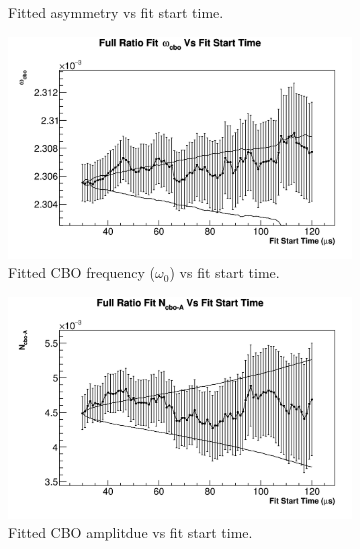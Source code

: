 \begin{figure}[]
\begin{subfigure}[t]{0.45\textwidth}
		    \caption{Fitted asymmetry vs fit start time.}
	    \end{subfigure}
	    \begin{subfigure}[t]{0.45\textwidth}
		    \centering
			\includegraphics[width=\textwidth]{RatioCBO_omega_cbo_FS_Canv}
		    \caption{Fitted CBO frequency ($\omega_{0}$) vs fit start time.}
	    \end{subfigure}%
	    \vspace{4mm}
	    \begin{subfigure}[t]{0.45\textwidth}
		    \centering
			\includegraphics[width=\textwidth]{RatioCBO_N_cbo-A_FS_Canv}
		    \caption{Fitted CBO amplitdue vs fit start time.}
	    \end{subfigure}
	    \begin{subfigure}[t]{0.45\textwidth}
		    \centering

\end{subfigure}
\end{figure}
